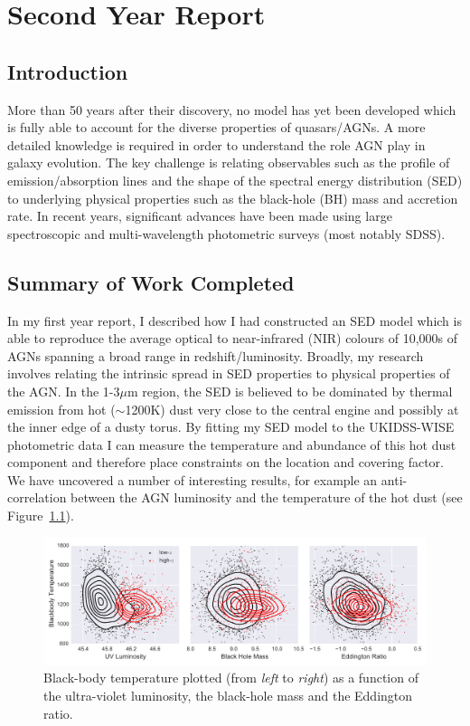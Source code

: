 \chapter{Second Year Report}\label{ch:2yearreport} 

\section{Introduction}

More than 50 years after their discovery, no model has yet been developed which is fully able to account for the diverse properties of quasars/AGNs. A more detailed knowledge is required in order to understand the role AGN play in galaxy evolution. The key challenge is relating observables such as the profile of emission/absorption lines and the shape of the spectral energy distribution (SED) to underlying physical properties such as the black-hole (BH) mass and accretion rate. In recent years, significant advances have been made using large spectroscopic and multi-wavelength photometric surveys (most notably SDSS). 

\section{Summary of Work Completed}

In my first year report, I described how I had constructed an SED model which is able to reproduce the average optical to near-infrared (NIR) colours of 10,000s of AGNs spanning a broad range in redshift/luminosity. Broadly, my research involves relating the intrinsic spread in SED properties to physical properties of the AGN. In the 1-3$\mu$m region, the SED is believed to be dominated by thermal emission from hot ($\sim$1200K) dust very close to the central engine and possibly at the inner edge of a dusty torus. By fitting my SED model to the UKIDSS-WISE photometric data I can measure the temperature and abundance of this hot dust component and therefore place constraints on the location and covering factor. We have uncovered a number of interesting results, for example an anti-correlation between the AGN luminosity and the temperature of the hot dust (see Figure~\ref{fig:figure1}). 

\begin{figure}
    \centering
    \includegraphics[width=\columnwidth]{figures/chapter05/figure2.pdf}
    \caption{Black-body temperature plotted (from {\it left} to {\it right}) as a function of the ultra-violet luminosity, the black-hole mass and the Eddington ratio.}  
    \label{fig:figure1}
\end{figure}

